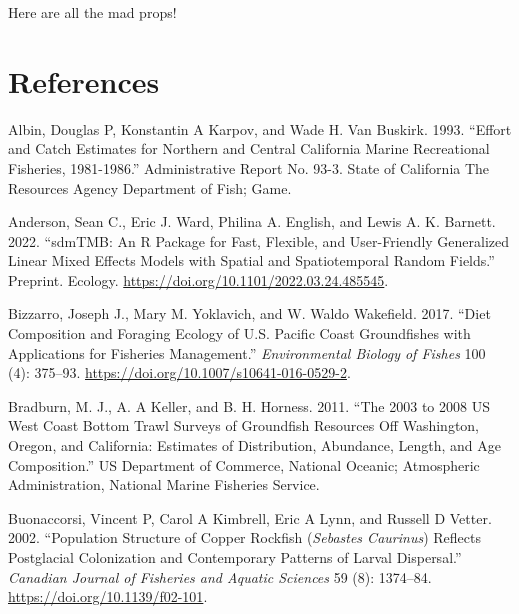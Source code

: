 \documentclass[11pt,
  english,
  letterpaper,
]{article}
\newlength{\cslhangindent}
\newenvironment{CSLReferences}[2] %
 {%
  \setlength{\parindent}{0pt}
  \ifodd #1 \everypar{\setlength{\hangindent}{\cslhangindent}}\ignorespaces\fi
  \ifnum #2 > 0
  \setlength{\parskip}{#2\baselineskip}
  \fi
 }%
 {}
\begin{document}
Here are all the mad props!

\clearpage

\hypertarget{references}{%
\section{References}\label{references}}

\hypertarget{refs}{}
\begin{CSLReferences}{1}{0}
\leavevmode{}%
Albin, Douglas P, Konstantin A Karpov, and Wade H. Van Buskirk. 1993. {``Effort and Catch Estimates for {Northern} and {Central} {California} Marine Recreational Fisheries, 1981-1986.''} Administrative Report No. 93-3. State of California The Resources Agency Department of Fish; Game.

\leavevmode{}%
Anderson, Sean C., Eric J. Ward, Philina A. English, and Lewis A. K. Barnett. 2022. {``{sdmTMB}: An {R} Package for Fast, Flexible, and User-Friendly Generalized Linear Mixed Effects Models with Spatial and Spatiotemporal Random Fields.''} Preprint. Ecology. \url{https://doi.org/10.1101/2022.03.24.485545}.

\leavevmode{}%
Bizzarro, Joseph J., Mary M. Yoklavich, and W. Waldo Wakefield. 2017. {``Diet Composition and Foraging Ecology of {U}.{S}. {Pacific} {Coast} Groundfishes with Applications for Fisheries Management.''} \emph{Environmental Biology of Fishes} 100 (4): 375--93. \url{https://doi.org/10.1007/s10641-016-0529-2}.

\leavevmode{}%
Bradburn, M. J., A. A Keller, and B. H. Horness. 2011. {``The 2003 to 2008 {US} {West} {Coast} Bottom Trawl Surveys of Groundfish Resources Off {Washington}, {Oregon}, and {California}: Estimates of Distribution, Abundance, Length, and Age Composition.''} US Department of Commerce, National Oceanic; Atmospheric Administration, National Marine Fisheries Service.

\leavevmode{}%
Buonaccorsi, Vincent P, Carol A Kimbrell, Eric A Lynn, and Russell D Vetter. 2002. {``Population Structure of Copper Rockfish (\emph{{Sebastes} Caurinus}) Reflects Postglacial Colonization and Contemporary Patterns of Larval Dispersal.''} \emph{Canadian Journal of Fisheries and Aquatic Sciences} 59 (8): 1374--84. \url{https://doi.org/10.1139/f02-101}.


\end{CSLReferences}
\end{document}
